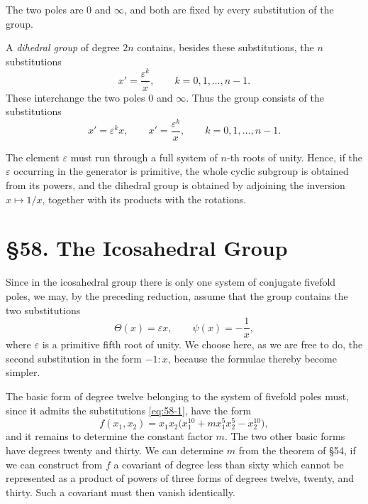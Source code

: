 \documentclass[11pt,a4paper]{book}
\newcommand{\webersection}[2]{\clearpage\section*{\S #1. #2}}
\newcommand{\eps}{\varepsilon}
\begin{document}
The two poles are \(0\) and \(\infty\), and both are fixed by every substitution of the group.

A \emph{dihedral group} of degree \(2n\) contains, besides these substitutions, the \(n\) substitutions
\begin{equation}
x'=\frac{\varepsilon^k}{x},
\qquad k=0,1,\ldots,n-1.
\end{equation}
These interchange the two poles \(0\) and \(\infty\).  Thus the group consists of the substitutions
\begin{equation}
x'=\varepsilon^k x,\qquad
x'=\frac{\varepsilon^k}{x},
\qquad k=0,1,\ldots,n-1.
\end{equation}

The element \(\varepsilon\) must run through a full system of \(n\)-th roots of unity.  Hence, if the \(\varepsilon\) occurring in the generator is primitive, the whole cyclic subgroup is obtained from its powers, and the dihedral group is obtained by adjoining the inversion \(x\mapsto 1/x\), together with its products with the rotations.

\newpage

\webersection{58}{The Icosahedral Group}

Since in the icosahedral group there is only one system of conjugate fivefold poles, we may, by the preceding reduction, assume that the group contains the two substitutions
\begin{equation}\label{eq:58-1}
 \Theta(x)=\eps x, \qquad \psi(x)=-\frac1x,
\end{equation}
where \(\eps\) is a primitive fifth root of unity.  We choose here, as we are free to do, the second substitution in the form \(-1:x\), because the formulae thereby become simpler.

The basic form of degree twelve belonging to the system of fivefold poles must, since it admits the substitutions \eqref{eq:58-1}, have the form
\begin{equation}\label{eq:58-2}
 f(x_1,x_2)=x_1x_2\bigl(x_1^{10}+m x_1^5x_2^5-x_2^{10}\bigr),
\end{equation}
and it remains to determine the constant factor \(m\).  The two other basic forms have degrees twenty and thirty.  We can determine \(m\) from the theorem of \S 54, if we can construct from \(f\) a covariant of degree less than sixty which cannot be represented as a product of powers of three forms of degrees twelve, twenty, and thirty.  Such a covariant must then vanish identically.
\end{document}
